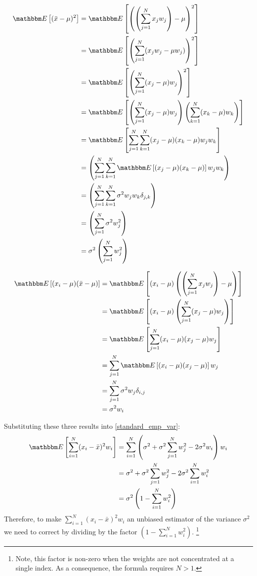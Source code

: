 \documentclass{article}
\newcommand{\E}[1]{\mathbbm E\left[#1\right]}
\begin{document}
\begin{align}
    \E{({\bar x} - \mu)^2} &= \E{\left( \left(\sum_{j=1}^N x_j w_j\right) - \mu \right)^2} \\\nonumber 
     &=  \E{\left( \sum_{j=1}^N (x_j w_j - \mu w_j) \right)^2} \\\nonumber 
     &=  \E{\left( \sum_{j=1}^N (x_j - \mu)w_j \right)^2} \\\nonumber 
     &=  \E{\left( \sum_{j=1}^N (x_j - \mu)w_j \right) \left(\sum_{k=1}^N (x_k - \mu) w_k\right)} \\\nonumber 
     &=  \E{ \sum_{j=1}^N \sum_{k=1}^N  (x_j - \mu) (x_k - \mu) w_j w_k}   \\\nonumber
     &=  \left( \sum_{j=1}^N \sum_{k=1}^N  \E{(x_j - \mu) (x_k - \mu)}w_j w_k\right) \\\nonumber 
     &=  \left( \sum_{j=1}^N \sum_{k=1}^N  \sigma^2 w_j w_k \delta_{j,k}\right) \\\nonumber 
     &=  \left( \sum_{j=1}^N \sigma^2 w_j^2 \right)  \\\nonumber
     &=  \sigma^2 \left( \sum_{j=1}^N w_j^2 \right)
\end{align}

\begin{align}
    \E{(x_i - \mu)({\bar x} - \mu)}  &= \E{(x_i - \mu) \left( \left( \sum_{j=1}^N x_j w_j\right) - \mu \right)} \\\nonumber 
    &=  \E{ (x_i - \mu) \left( \sum_{j=1}^N (x_j - \mu)w_j\right) } \\\nonumber 
    &=  \E{ \sum_{j=1}^N (x_i - \mu) (x_j - \mu)w_j} \\\nonumber 
    &=  \sum_{j=1}^N \E{(x_i - \mu) (x_j - \mu)} w_j \\\nonumber 
    &=  \sum_{j=1}^N \sigma^2 w_j \delta_{i,j} \\\nonumber 
    &=  \sigma^2 w_i
\end{align}

Substituting these three results into \eqref{standard_emp_var}:
\begin{align*}
    \E{\sum_{i=1}^N (x_i - {\bar x})^2 w_i}
    &= \sum_{i=1}^N \left( \sigma^2 + \sigma^2 \sum_{j=1}^N w_j^2 - 2\sigma^2 w_i \right) w_i \\
    &= \sigma^2 + \sigma^2 \sum_{j=1}^N w_j^2 - 2\sigma^2 \sum_{i=1}^N w_i^2 \\
    &= \sigma^2 \left(1 - \sum_{i=1}^N w_i^2\right)
\end{align*}
Therefore, to make $\sum_{i=1}^N (x_i - {\bar x})^2 w_i$ an unbiased estimator of the variance $\sigma^2$
we need to correct by dividing by the factor $\left( 1 - \sum_{i=1}^N w_i^2 \right)$.%
\footnote{Note, this factor is non-zero when the weights are not concentrated at a single index.
As a consequence, the formula requires $N > 1$.}
\end{document}
